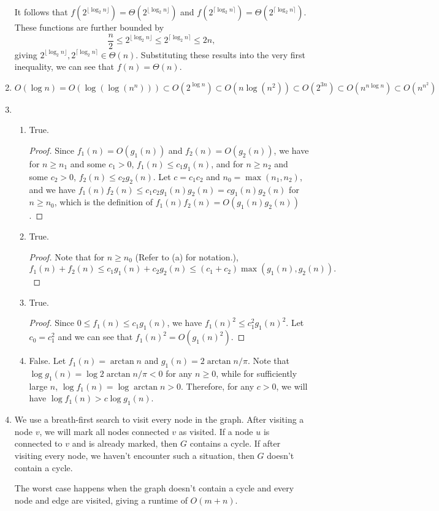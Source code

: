 \documentclass{article}
\begin{document}
\begin{enumerate}
    It follows that $f(2^{\lfloor\log_2 n\rfloor}) = \Theta(2^{\lfloor\log_2 n\rfloor})$ and $f(2^{\lceil\log_2 n\rceil}) = \Theta(2^{\lceil\log_2 n\rceil})$. These functions are further bounded by
    \[
        \frac{n}{2} \le 2^{\lfloor\log_2 n\rfloor} \le 2^{\lceil\log_2 n\rceil} \le 2n,
    \]
    giving $2^{\lfloor\log_2 n\rfloor}, 2^{\lceil\log_2 n\rceil} \in \Theta(n)$. Substituting these results into the very first inequality, we can see that $f(n) = \Theta(n)$.
    \item $O(\log n) = O(\log(\log(n^n))) \subset O(2^{\log n}) \subset O(n\log(n^2)) \subset O(2^{3n}) \subset O(n^{n\log n}) \subset O(n^{n^2})$
    \item
    \begin{enumerate}
        \item True.
        \begin{proof}
            Since $f_1(n) = O(g_1(n))$ and $f_2(n) = O(g_2(n))$, we have for $n \ge n_1$ and some $c_1 > 0$, $f_1(n) \le c_1g_1(n)$, and for $n \ge n_2$ and some $c_2 > 0$, $f_2(n) \le c_2g_2(n)$. Let $c = c_1c_2$ and $n_0 = \max(n_1, n_2)$, and we have $f_1(n)f_2(n) \le c_1c_2g_1(n)g_2(n) = cg_1(n)g_2(n)$ for $n \ge n_0$, which is the definition of $f_1(n)f_2(n) = O(g_1(n)g_2(n))$.
        \end{proof}
        \item True.
        \begin{proof}
            Note that for $n \ge n_0$ (Refer to (a) for notation.),
            \[
                f_1(n) + f_2(n) \le c_1g_1(n) + c_2g_2(n) \le (c_1 + c_2)\max(g_1(n), g_2(n)).
            \]
        \end{proof}
        \item True.
        \begin{proof}
            Since $0 \le f_1(n) \le c_1g_1(n)$, we have $f_1(n)^2 \le c_1^2g_1(n)^2$. Let $c_0 = c_1^2$ and we can see that $f_1(n)^2 = O(g_1(n)^2)$.
        \end{proof}
        \item False. Let $f_1(n) = \arctan n$ and $g_1(n) = 2\arctan n/\pi$. Note that $\log g_1(n) = \log 2\arctan n/\pi < 0$ for any $n \ge 0$, while for sufficiently large $n$, $\log f_1(n) = \log\arctan n > 0$. Therefore, for any $c > 0$, we will have $\log f_1(n) > c\log g_1(n)$.
    \end{enumerate}
    \item We use a breath-first search to visit every node in the graph. After visiting a node $v$, we will mark all nodes connected $v$ as visited. If a node $u$ is connected to $v$ and is already marked, then $G$ contains a cycle. If after visiting every node, we haven't encounter such a situation, then $G$ doesn't contain a cycle.
    
    The worst case happens when the graph doesn't contain a cycle and every node and edge are visited,  giving a runtime of $O(m + n)$.
\end{enumerate}
\end{document}
